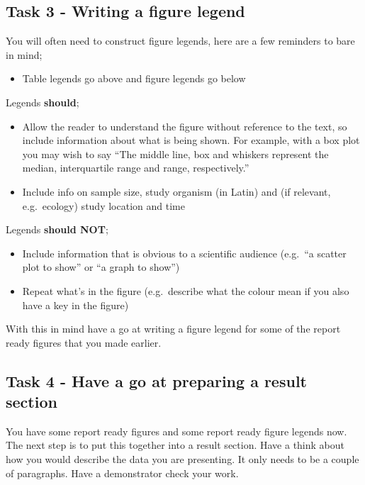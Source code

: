 \documentclass[
]{book}
\providecommand{\tightlist}{%
  \setlength{\itemsep}{0pt}\setlength{\parskip}{0pt}}
\begin{document}
\hypertarget{legend2}{%
\subsection{Task 3 - Writing a figure legend}\label{legend2}}

You will often need to construct figure legends, here are a few reminders to bare in mind;

\begin{itemize}
\tightlist
\item
  Table legends go above and figure legends go below
\end{itemize}

Legends \textbf{should};

\begin{itemize}
\tightlist
\item
  Allow the reader to understand the figure without reference to the text, so include information about what is being shown. For example, with a box plot you may wish to say ``The middle line, box and whiskers represent the median, interquartile range and range, respectively.''
\item
  Include info on sample size, study organism (in Latin) and (if relevant, e.g.~ecology) study location and time
\end{itemize}

Legends \textbf{should NOT};

\begin{itemize}
\tightlist
\item
  Include information that is obvious to a scientific audience (e.g.~``a scatter plot to show'' or ``a graph to show'')
\item
  Repeat what's in the figure (e.g.~describe what the colour mean if you also have a key in the figure)
\end{itemize}

With this in mind have a go at writing a figure legend for some of the report ready figures that you made earlier.

\hypertarget{task-4---have-a-go-at-preparing-a-result-section}{%
\subsection{Task 4 - Have a go at preparing a result section}\label{task-4---have-a-go-at-preparing-a-result-section}}

You have some report ready figures and some report ready figure legends now. The next step is to put this together into a result section. Have a think about how you would describe the data you are presenting. It only needs to be a couple of paragraphs. Have a demonstrator check your work.
\end{document}
